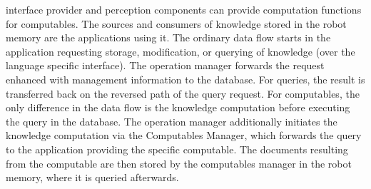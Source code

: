 interface provider and perception components can provide computation
functions for computables. The sources and consumers of knowledge
stored in the robot memory are the applications using it. The ordinary
data flow starts in the application requesting storage, modification,
or querying of knowledge (over the language specific interface). The
operation manager forwards the request enhanced with management
information to the database. For queries, the result is transferred
back on the reversed path of the query request. For computables, the
only difference in the data flow is the knowledge computation before
executing the query in the database. The operation manager
additionally initiates the knowledge computation via the Computables
Manager, which forwards the query to the application providing the
specific computable. The documents resulting from the computable are
then stored by the computables manager in the robot memory, where it
is queried afterwards.

